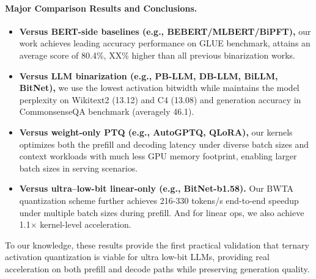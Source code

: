 \begin{revmeta}[]
\paragraph{Major Comparison Results and Conclusions. } 
\begin{itemize}
    \item \textbf{Versus BERT-side baselines (e.g., BEBERT/MLBERT/BiPFT),} our work achieves leading accuracy performance on GLUE benchmark, attains an average score of 80.4\%, XX\% higher than all previous binarization works. 
    \item\textbf{Versus LLM binarization (e.g., PB-LLM, DB-LLM, BiLLM, BitNet),} we use the lowest activation bitwidth while maintains the model perplexity on Wikitext2 (13.12) and C4 (13.08) and generation accuracy in CommonsenseQA benchmark (averagely 46.1). 
    \item \textbf{Versus weight-only PTQ (e.g., AutoGPTQ, QLoRA),} our kernels  optimizes both the prefill and decoding latency under diverse batch sizes and context workloads with much less GPU memory footprint, enabling larger batch sizes in serving scenarios. 
    \item \textbf{Versus ultra–low-bit linear-only (e.g., BitNet-b1.58).} Our BWTA quantization scheme further achieves 216-330 tokens/s end-to-end speedup under multiple batch sizes during prefill. And for linear ops, we also achieve 1.1$\times$ kernel-level acceleration. 
\end{itemize}

To our knowledge, these results provide the first practical validation that ternary activation quantization is viable for ultra low-bit LLMs, providing real acceleration on both prefill and decode paths while preserving generation quality. 

\end{revmeta}


